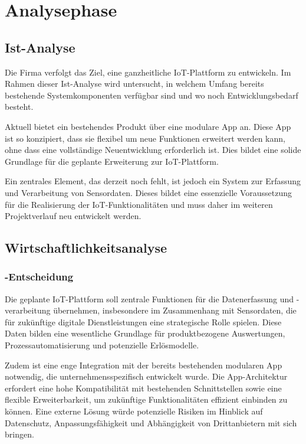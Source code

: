 \section{Analysephase} 
\label{sec:Analysephase}


\subsection{Ist-Analyse} 
\label{sec:IstAnalyse}
	Die Firma \OFF verfolgt das Ziel, eine ganzheitliche \ac{IoT}-Plattform zu entwickeln.
	Im Rahmen dieser Ist-Analyse wird untersucht, in welchem Umfang bereits bestehende Systemkomponenten verfügbar sind
	und wo noch Entwicklungsbedarf besteht.

	Aktuell bietet \OFF ein bestehendes Produkt über eine modulare App an.
	Diese App ist so konzipiert, dass sie flexibel um neue Funktionen erweitert werden kann,
	ohne dass eine vollständige Neuentwicklung erforderlich ist.
	Dies bildet eine solide Grundlage für die geplante Erweiterung zur IoT-Plattform.

	Ein zentrales Element, das derzeit noch fehlt, ist jedoch ein System zur Erfassung und Verarbeitung von Sensordaten.
	Dieses bildet eine essenzielle Voraussetzung für die Realisierung der IoT-Funktionalitäten
	und muss daher im weiteren Projektverlauf neu entwickelt werden.


\subsection{Wirtschaftlichkeitsanalyse}
\label{sec:Wirtschaftlichkeitsanalyse}


	\subsubsection{-Entscheidung}
	\label{sec:MakeOrBuyEntscheidung}
		Die geplante IoT-Plattform soll zentrale Funktionen für die Datenerfassung und -verarbeitung übernehmen,
		insbesondere im Zusammenhang mit Sensordaten, die für zukünftige digitale Dienstleistungen eine strategische Rolle spielen.
		Diese Daten bilden eine wesentliche Grundlage für produktbezogene Auswertungen, Prozessautomatisierung und potenzielle Erlösmodelle.

		Zudem ist eine enge Integration mit der bereits bestehenden modularen App notwendig,
		die unternehmensspezifisch entwickelt wurde. Die App-Architektur erfordert eine hohe Kompatibilität mit bestehenden Schnittstellen
		sowie eine flexible Erweiterbarkeit, um zukünftige Funktionalitäten effizient einbinden zu können.
		Eine externe Lösung würde potenzielle Risiken im Hinblick auf Datenschutz,
		Anpassungsfähigkeit und Abhängigkeit von Drittanbietern mit sich bringen.

